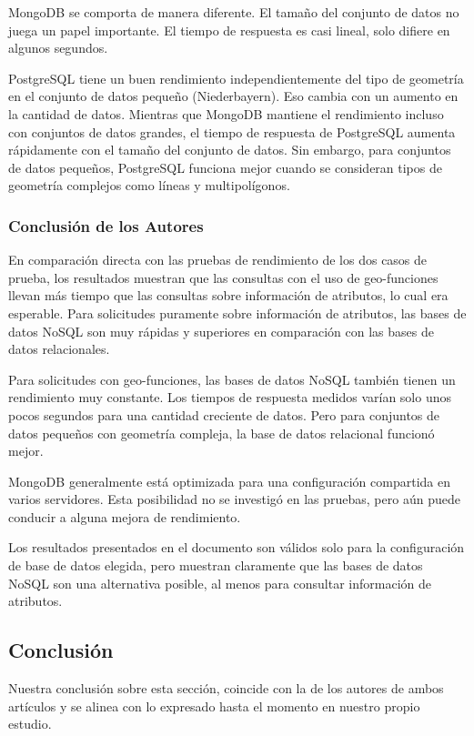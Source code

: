 \documentclass[pdflatex,sn-mathphys-num]{sn-jnl}
\theoremstyle{thmstyleone}%
\theoremstyle{thmstyletwo}%
\theoremstyle{thmstylethree}%
\begin{document}
MongoDB se comporta de manera diferente. El tamaño del conjunto de datos no juega un papel importante. El tiempo de respuesta es casi lineal, solo difiere en algunos segundos.

PostgreSQL tiene un buen rendimiento independientemente del tipo de geometría en el conjunto de datos pequeño (Niederbayern). Eso cambia con un aumento en la cantidad de datos. Mientras que MongoDB mantiene el rendimiento incluso con conjuntos de datos grandes, el tiempo de respuesta de PostgreSQL aumenta rápidamente con el tamaño del conjunto de datos. Sin embargo, para conjuntos de datos pequeños, PostgreSQL funciona mejor cuando se consideran tipos de geometría complejos como líneas y multipolígonos.

\subsubsection{Conclusión de los Autores}\label{sec523}

En comparación directa con las pruebas de rendimiento de los dos casos de prueba, los resultados muestran que las consultas con el uso de geo-funciones llevan más tiempo que las consultas sobre información de atributos, lo cual era esperable. Para solicitudes puramente sobre información de atributos, las bases de datos NoSQL son muy rápidas y superiores en comparación con las bases de datos relacionales.

Para solicitudes con geo-funciones, las bases de datos NoSQL también tienen un rendimiento muy constante. Los tiempos de respuesta medidos varían solo unos pocos segundos para una cantidad creciente de datos. Pero para conjuntos de datos pequeños con geometría compleja, la base de datos relacional funcionó mejor.

MongoDB generalmente está optimizada para una configuración compartida en varios servidores. Esta posibilidad no se investigó en las pruebas, pero aún puede conducir a alguna mejora de rendimiento.

Los resultados presentados en el documento son válidos solo para la configuración de base de datos elegida, pero muestran claramente que las bases de datos NoSQL son una alternativa posible, al menos para consultar información de atributos.

\subsection{Conclusión}\label{sec53}

Nuestra conclusión sobre esta sección, coincide con la de los autores de ambos artículos y se alinea con lo expresado hasta el momento en nuestro propio estudio.
\end{document}
